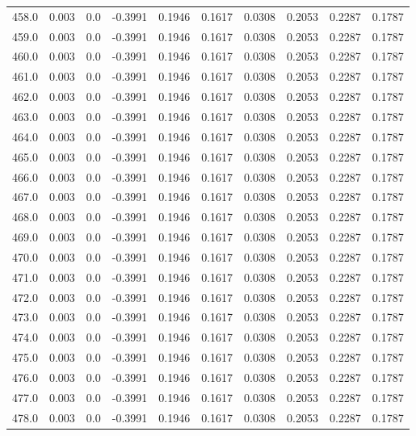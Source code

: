\begin{longtable}{lrrrrrrrrr}
458.0 & 0.003 & 0.0 & -0.3991 & 0.1946 & 0.1617 & 0.0308 & 0.2053 & 0.2287 & 0.1787 \\
459.0 & 0.003 & 0.0 & -0.3991 & 0.1946 & 0.1617 & 0.0308 & 0.2053 & 0.2287 & 0.1787 \\
460.0 & 0.003 & 0.0 & -0.3991 & 0.1946 & 0.1617 & 0.0308 & 0.2053 & 0.2287 & 0.1787 \\
461.0 & 0.003 & 0.0 & -0.3991 & 0.1946 & 0.1617 & 0.0308 & 0.2053 & 0.2287 & 0.1787 \\
462.0 & 0.003 & 0.0 & -0.3991 & 0.1946 & 0.1617 & 0.0308 & 0.2053 & 0.2287 & 0.1787 \\
463.0 & 0.003 & 0.0 & -0.3991 & 0.1946 & 0.1617 & 0.0308 & 0.2053 & 0.2287 & 0.1787 \\
464.0 & 0.003 & 0.0 & -0.3991 & 0.1946 & 0.1617 & 0.0308 & 0.2053 & 0.2287 & 0.1787 \\
465.0 & 0.003 & 0.0 & -0.3991 & 0.1946 & 0.1617 & 0.0308 & 0.2053 & 0.2287 & 0.1787 \\
466.0 & 0.003 & 0.0 & -0.3991 & 0.1946 & 0.1617 & 0.0308 & 0.2053 & 0.2287 & 0.1787 \\
467.0 & 0.003 & 0.0 & -0.3991 & 0.1946 & 0.1617 & 0.0308 & 0.2053 & 0.2287 & 0.1787 \\
468.0 & 0.003 & 0.0 & -0.3991 & 0.1946 & 0.1617 & 0.0308 & 0.2053 & 0.2287 & 0.1787 \\
469.0 & 0.003 & 0.0 & -0.3991 & 0.1946 & 0.1617 & 0.0308 & 0.2053 & 0.2287 & 0.1787 \\
470.0 & 0.003 & 0.0 & -0.3991 & 0.1946 & 0.1617 & 0.0308 & 0.2053 & 0.2287 & 0.1787 \\
471.0 & 0.003 & 0.0 & -0.3991 & 0.1946 & 0.1617 & 0.0308 & 0.2053 & 0.2287 & 0.1787 \\
472.0 & 0.003 & 0.0 & -0.3991 & 0.1946 & 0.1617 & 0.0308 & 0.2053 & 0.2287 & 0.1787 \\
473.0 & 0.003 & 0.0 & -0.3991 & 0.1946 & 0.1617 & 0.0308 & 0.2053 & 0.2287 & 0.1787 \\
474.0 & 0.003 & 0.0 & -0.3991 & 0.1946 & 0.1617 & 0.0308 & 0.2053 & 0.2287 & 0.1787 \\
475.0 & 0.003 & 0.0 & -0.3991 & 0.1946 & 0.1617 & 0.0308 & 0.2053 & 0.2287 & 0.1787 \\
476.0 & 0.003 & 0.0 & -0.3991 & 0.1946 & 0.1617 & 0.0308 & 0.2053 & 0.2287 & 0.1787 \\
477.0 & 0.003 & 0.0 & -0.3991 & 0.1946 & 0.1617 & 0.0308 & 0.2053 & 0.2287 & 0.1787 \\
478.0 & 0.003 & 0.0 & -0.3991 & 0.1946 & 0.1617 & 0.0308 & 0.2053 & 0.2287 & 0.1787 \\

\end{longtable}
